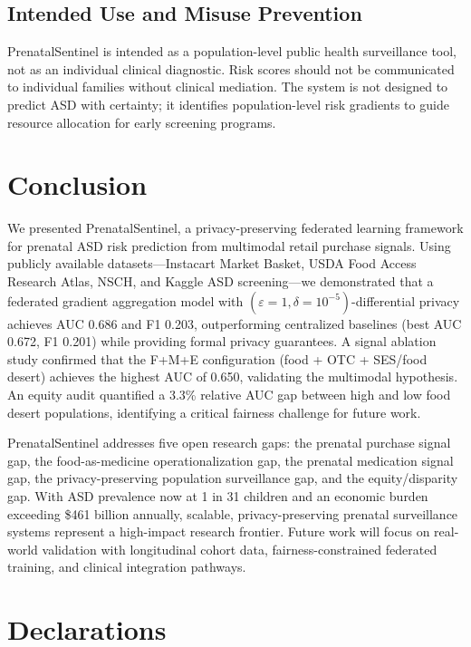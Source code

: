 \documentclass[journal]{IEEEtran}
\newcommand{\eps}{\varepsilon}
\begin{document}
\subsection{Intended Use and Misuse Prevention}

PrenatalSentinel is intended as a population-level public health
surveillance tool, not as an individual clinical diagnostic. Risk
scores should not be communicated to individual families without
clinical mediation. The system is not designed to predict ASD with
certainty; it identifies population-level risk gradients to guide
resource allocation for early screening programs.

\section{Conclusion}
\label{sec:conclusion}

We presented PrenatalSentinel, a privacy-preserving federated
learning framework for prenatal ASD risk prediction from multimodal
retail purchase signals. Using publicly available datasets---Instacart
Market Basket, USDA Food Access Research Atlas, NSCH, and Kaggle
ASD screening---we demonstrated that a federated gradient aggregation
model with $(\eps=1,\delta=10^{-5})$-differential privacy achieves
AUC 0.686 and F1 0.203, outperforming centralized baselines (best
AUC 0.672, F1 0.201) while providing formal privacy guarantees. A signal ablation study
confirmed that the F+M+E configuration (food + OTC + SES/food desert)
achieves the highest AUC of 0.650, validating the multimodal
hypothesis. An equity audit quantified a 3.3\% relative AUC gap
between high and low food desert populations, identifying a
critical fairness challenge for future work.

PrenatalSentinel addresses five open research gaps: the prenatal
purchase signal gap, the food-as-medicine operationalization gap,
the prenatal medication signal gap, the privacy-preserving
population surveillance gap, and the equity/disparity gap. With
ASD prevalence now at 1 in 31 children and an economic burden
exceeding \$461 billion annually, scalable, privacy-preserving
prenatal surveillance systems represent a high-impact research
frontier. Future work will focus on real-world validation with
longitudinal cohort data, fairness-constrained federated training,
and clinical integration pathways.

\section*{Declarations}
\end{document}
